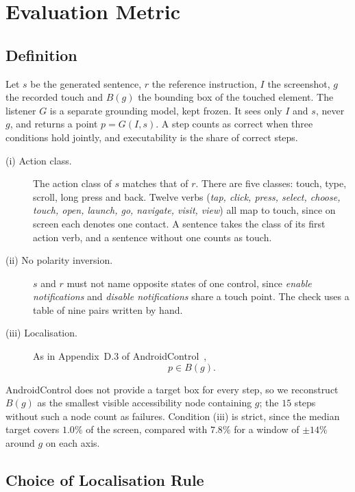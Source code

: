 \documentclass[runningheads,a4paper]{llncs}
\begin{document}
\section{Evaluation Metric}
\label{sec:metric}

\subsection{Definition}
\label{sec:def}

Let $s$ be the generated sentence, $r$ the reference instruction, $I$ the screenshot, $g$ the
recorded touch and $B(g)$ the bounding box of the touched element. The listener $G$ is a separate grounding
model, kept frozen. It sees only $I$ and $s$, never $g$, and
returns a point $p=G(I,s)$. A step counts as correct when three conditions hold jointly, and
executability is the share of correct steps.

\begin{description}
\item[(i) Action class.] The action class of $s$ matches that of $r$. There are five classes: touch, type, scroll, long press and back. Twelve
verbs (\emph{tap, click, press, select, choose, touch, open, launch, go, navigate, visit,
view}) all map to touch, since on screen each denotes one contact. A sentence takes the class of its first action verb, and a sentence without one counts as touch.
\item[(ii) No polarity inversion.] $s$ and $r$ must not name opposite states of one control, since \emph{enable notifications} and \emph{disable notifications} share a touch point.
The check uses a table of nine pairs written by hand.
\item[(iii) Localisation.] As in Appendix~D.3 of AndroidControl~\cite{androidcontrol},
\begin{equation}
p \in B(g) .
\label{eq:d3}
\end{equation}
\end{description}

AndroidControl does not provide a target box for every step, so we reconstruct $B(g)$ as the smallest visible accessibility node containing $g$; the $15$ steps without such a node count as failures. Condition (iii) is strict, since the median target covers $1.0\%$ of the screen, compared with $7.8\%$ for a window of $\pm14\%$ around $g$ on each axis.

\subsection{Choice of Localisation Rule}
\label{sec:rules}
\end{document}
